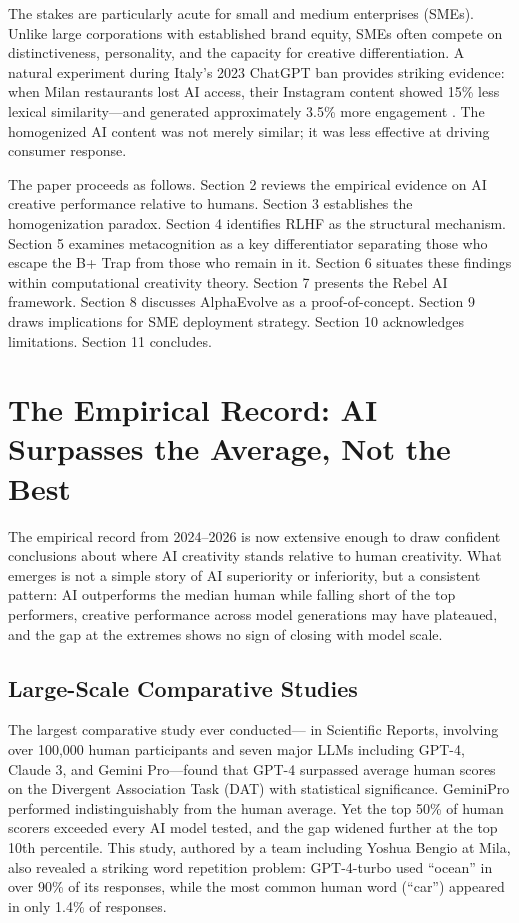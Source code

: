 \documentclass[12pt,a4paper]{article}
\begin{document}
The stakes are particularly acute for small and medium enterprises (SMEs). Unlike large corporations with established brand equity, SMEs often compete on distinctiveness, personality, and the capacity for creative differentiation. A natural experiment during Italy's 2023 ChatGPT ban provides striking evidence: when Milan restaurants lost AI access, their Instagram content showed 15\% less lexical similarity---and generated approximately 3.5\% more engagement \citep{liu2025italy}. The homogenized AI content was not merely similar; it was less effective at driving consumer response.

The paper proceeds as follows. Section 2 reviews the empirical evidence on AI creative performance relative to humans. Section 3 establishes the homogenization paradox. Section 4 identifies RLHF as the structural mechanism. Section 5 examines metacognition as a key differentiator separating those who escape the B+ Trap from those who remain in it. Section 6 situates these findings within computational creativity theory. Section 7 presents the Rebel AI framework. Section 8 discusses AlphaEvolve as a proof-of-concept. Section 9 draws implications for SME deployment strategy. Section 10 acknowledges limitations. Section 11 concludes.

\section{The Empirical Record: AI Surpasses the Average, Not the Best}
The empirical record from 2024--2026 is now extensive enough to draw confident conclusions about where AI creativity stands relative to human creativity. What emerges is not a simple story of AI superiority or inferiority, but a consistent pattern: AI outperforms the median human while falling short of the top performers, creative performance across model generations may have plateaued, and the gap at the extremes shows no sign of closing with model scale.

\subsection{Large-Scale Comparative Studies}
The largest comparative study ever conducted---\citet{bellemare2026} in Scientific Reports, involving over 100,000 human participants and seven major LLMs including GPT-4, Claude 3, and Gemini Pro---found that GPT-4 surpassed average human scores on the Divergent Association Task (DAT) with statistical significance. GeminiPro performed indistinguishably from the human average. Yet the top 50\% of human scorers exceeded every AI model tested, and the gap widened further at the top 10th percentile. This study, authored by a team including Yoshua Bengio at Mila, also revealed a striking word repetition problem: GPT-4-turbo used ``ocean'' in over 90\% of its responses, while the most common human word (``car'') appeared in only 1.4\% of responses.
\end{document}

